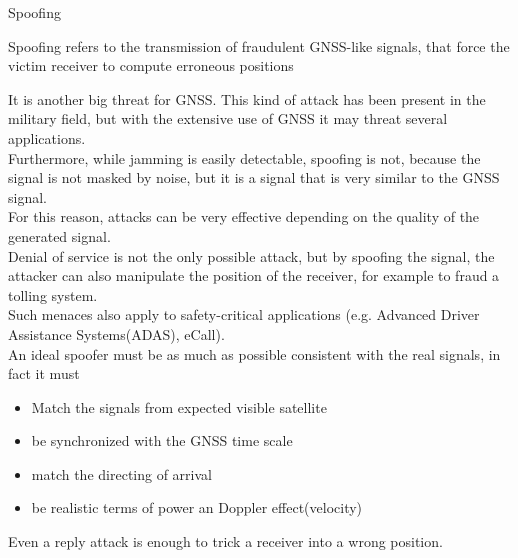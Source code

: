     \begin{section}{Spoofing}
      \begin{boxH}
         Spoofing refers to the transmission of fraudulent GNSS-like signals, that force the
         victim receiver to compute erroneous positions
      \end{boxH}
      It is another big threat for GNSS. This kind of attack has been present in the military 
      field, but with the extensive use of GNSS it may threat several applications.\\

      Furthermore, while jamming is easily detectable, spoofing is not, because the signal is
      not masked by noise, but it is a signal that is very similar to the GNSS signal.\\
      For this reason, attacks can be very effective depending on the quality of the generated 
      signal.\\

      Denial of service is not the only possible attack, but by spoofing the signal, the attacker
      can also manipulate the position of the receiver, for example to fraud a tolling system.\\
      Such menaces also apply to safety-critical applications (e.g. Advanced Driver Assistance 
      Systems(ADAS), eCall).\\

      An ideal spoofer must be as much as possible consistent with the real signals, in fact it must
      \begin{itemize}
        \item Match the signals from expected visible satellite
        \item be synchronized with the GNSS time scale
        \item match the directing of arrival
        \item be realistic terms of power an Doppler effect(velocity)
      \end{itemize}
      Even a reply attack is enough to trick a receiver into a wrong position.\\


\end{section}
